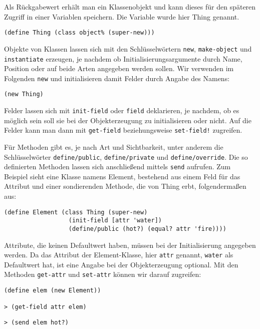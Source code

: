 Als Rückgabewert erhält man ein Klassenobjekt und kann dieses für den späteren Zugriff in einer Variablen speichern. Die Variable wurde hier Thing genannt.

\begin{lstlisting}
(define Thing (class object% (super-new)))
\end{lstlisting}

Objekte von Klassen lassen sich mit den Schlüsselwörtern \texttt{new}, \texttt{make-object} und \texttt{instantiate} erzeugen, je nachdem ob Initialisierungsargumente durch Name, Position oder auf beide Arten angegeben werden sollen. Wir verwenden im Folgenden \texttt{new} und initialisieren damit Felder durch Angabe des Namens:

\begin{lstlisting}
(new Thing)
\end{lstlisting}

Felder lassen sich mit \texttt{init-field} oder \texttt{field} deklarieren, je nachdem, ob es möglich sein soll sie bei der Objekterzeugung zu initialisieren oder nicht. Auf die Felder kann man dann mit \texttt{get-field} beziehungsweise \texttt{set-field!} zugreifen. 

Für Methoden gibt es, je nach Art und Sichtbarkeit, unter anderem die Schlüsselwörter \texttt{define/public}, \texttt{define/private} und \texttt{define/override}. Die so definierten Methoden lassen sich anschließend mittels \texttt{send} aufrufen. Zum Beispiel sieht eine Klasse namens Element, bestehend aus einem Feld für das Attribut und einer sondierenden Methode, die von Thing erbt, folgendermaßen aus:

\begin{lstlisting}
(define Element (class Thing (super-new)
                  (init-field [attr 'water])
                  (define/public (hot?) (equal? attr 'fire))))
\end{lstlisting}

Attribute, die keinen Defaultwert haben, müssen bei der Initialisierung angegeben werden. Da das Attribut der Element-Klasse, hier \texttt{attr} genannt, \texttt{{\textquotesingle}water} als Defaultwert hat, ist eine Angabe bei der Objekterzeugung optional. Mit den Methoden \texttt{get-attr} und \texttt{set-attr} können wir darauf zugreifen:


\begin{lstlisting}
(define elem (new Element))

> (get-field attr elem)
\end{lstlisting} 
{}
\begin{lstlisting}
> (send elem hot?)
\end{lstlisting} 
{}

